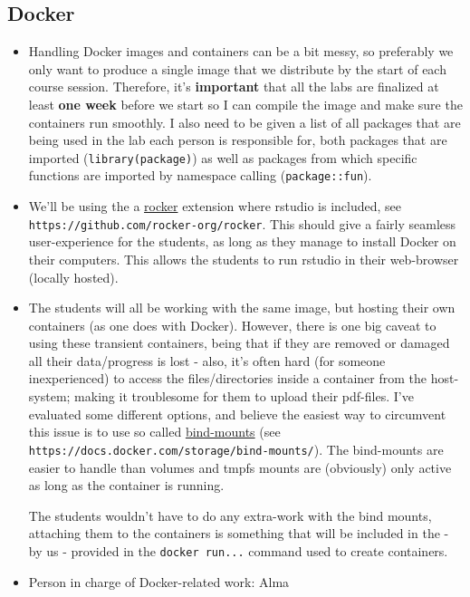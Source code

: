 \documentclass[11pt]{article}
\begin{document}
\subsection{Docker}
\label{sec:orgb05764c}
\begin{itemize}
\item Handling Docker images and containers can be a bit messy, so preferably we
only want to produce a single image that we distribute by the start of each
course session. Therefore, it's \textbf{\textbf{important}} that all the labs are
finalized at least \textbf{\textbf{one week}} before we start so I can compile the image
and make sure the containers run smoothly. I also need to  be given a list
of all packages that are being used in the lab each person is responsible
for, both packages that are imported (\texttt{library(package)}) as well as packages
from which specific functions are imported by namespace calling (\texttt{package::fun}).

\item We'll be using the a \uline{rocker} extension where rstudio is included, see
\texttt{https://github.com/rocker-org/rocker}. This should give a fairly seamless
user-experience for the students, as long as they manage to install Docker
on their computers. This allows the students to run rstudio in their
web-browser (locally hosted).

\item The students will all be working with the same image, but hosting their own
containers (as one does with Docker). However, there is one big caveat to
using these transient containers, being that if they are removed or damaged
all their data/progress is lost - also, it's often hard (for someone
inexperienced) to access the files/directories inside a container from the
host-system; making it troublesome for them to upload their pdf-files. I've
evaluated some different options, and believe the easiest way to circumvent
this issue is to use so called \uline{bind-mounts} (see
\texttt{https://docs.docker.com/storage/bind-mounts/}). The bind-mounts are easier
to handle than volumes and tmpfs mounts are (obviously) only active as long
as the container is running.

The students wouldn't have to do any extra-work with the bind mounts,
attaching them to the containers is something that will be included in the -
by us - provided in the \texttt{docker run...} command used to create containers.

\item Person in charge of Docker-related work: Alma
\end{itemize}
\end{document}
